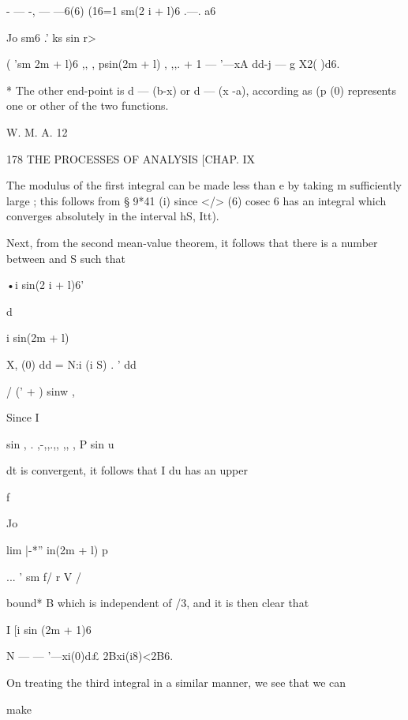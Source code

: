  -  — -, — —6(6) (16=1 sm(2 i + l)6 .—. a6 

Jo sm6   .' ks sin r> 

( 'sm 2m + l)6 ,, ,  psin(2m + l)  , ,,. 
+ 1 —  '—xA dd-j — g X2( )d6. 

* The other end-point is d —  (b-x) or d —  (x -a), according as (p (0) represents one or 
other of the two functions. 

W. M. A. 12 



178 THE PROCESSES OF ANALYSIS [CHAP. IX 

The modulus of the first integral can be made less than e by taking 
m sufficiently large ; this follows from § 9*41 (i) since </> (6) cosec 6 has an 
integral which converges absolutely in the interval  hS, Itt). 

Next, from the second mean-value theorem, it follows that there is a 
number   between and S such that 



•i sin(2 i + l)6' 







d 



i sin(2m + l)  



X, (0) dd = N:i (i S) .   ' dd 

  / (' + ) sinw , 



Since I 



sin   , . ,-,,.,, ,, , P sin u 



dt is convergent, it follows that I du has an upper 



f 

Jo 



lim |-*'' in(2m + l)  p 

...     '   sm f/ r V / 



bound* B which is independent of /3, and it is then clear that 

I [i  sin (2m + 1)6   

N —  —  '—xi(0)d£  2Bxi(i8)<2B6. 

On treating the third integral in a similar manner, we see that we can 

make 

